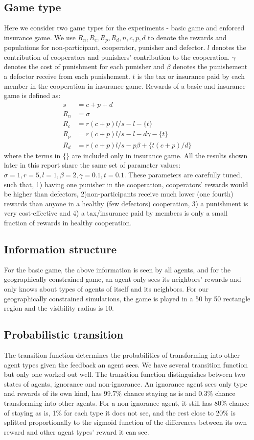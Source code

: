\documentclass[11pt]{article}
\begin{document}
\subsection{Game type}\label{sec:game_type}
Here we consider two game types for the experiments - basic game and enforced insurance game. We use $R_n,R_c,R_p,R_d,n,c,p,d$ to denote the rewards and populations for non-participant, cooperator, punisher and defector. $l$ denotes the contribution of cooperators and punishers' contribution to the cooperation. $\gamma$ denotes the cost of punishment for each punisher and $\beta$ denotes the punishement a defoctor receive from each punishement. $t$ is the tax or insurance paid by each member in the cooperation in insurance game. Rewards of a basic and insurance game is defined as:
\begin{align}
s &= c + p + d \\
R_n &= \sigma \\
R_c &= r(c+p)l/s - l - \{t\} \\
R_p &= r(c+p)l/s - l - d\gamma - \{t\}\\
R_d &= r(c+p)l/s - p\beta + \{ t(c+p)/d \}
\end{align}
where the terms in $\{\}$ are included only in insurance game. All the results shown later in this report share the same set of parameter values: $\sigma=1,r=5,l=1,\beta=2,\gamma=0.1,t=0.1$. These parameters are carefully tuned, such that, 1) having one punisher in the cooperation, cooperators' rewards would be higher than defectors, 2)non-participants receive much lower (one fourth) rewards than anyone in a healthy (few defectors) cooperation, 3) a punishment is very cost-effective and 4) a tax/insurance paid by members is only a small fraction of rewards in healthy cooperation.

\subsection{Information structure}
For the basic game, the above information is seen by all agents, and for the geographically constrained game, an agent only sees its neighbors' rewards and only knows about types of agents of itself and its neighbors. For our geographically constrained simulations, the game is played in a 50 by 50 rectangle region and the visibility radius is 10.

\subsection{Probabilistic transition}
The transition function determines the probabilities of transforming into other agent types given the feedback an agent sees. We have several transition function but only one worked out well. The transition function distinguishes between two states of agents, ignorance and non-ignorance. An ignorance agent sees only type and rewards of its own kind, has 99.7\% chance staying as is and 0.3\% chance transforming into other agents. For a non-ignorance agent, it still has 80\% chance of staying as is, 1\% for each type it does not see, and the rest close to 20\% is splitted proportionally to the sigmoid function of the differences between its own reward and other agent types' reward it can see.
\end{document}
